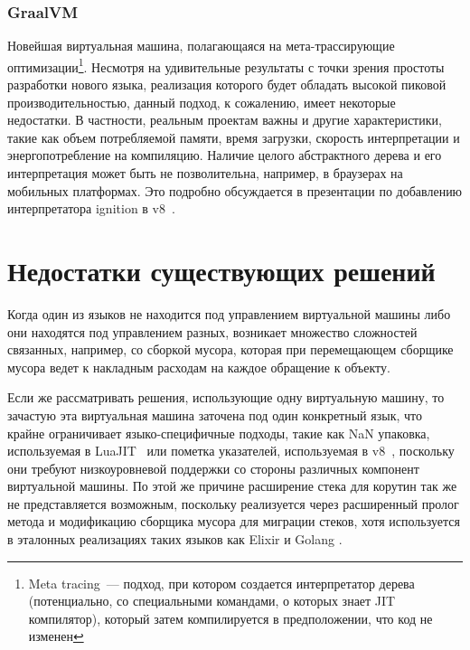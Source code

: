 \documentclass[times
]{itmo-student-thesis}
\begin{document}
\subsubsection{GraalVM}
Новейшая виртуальная машина, полагающаяся на мета-трассирующие оптимизации\footnote{Meta tracing~--- подход, при котором создается интерпретатор дерева (потенциально, со специальными командами, о которых знает JIT компилятор), который затем компилируется в предположении, что код не изменен}. Несмотря на удивительные результаты с точки зрения простоты разработки нового языка, реализация которого будет обладать высокой пиковой производительностью, данный подход, к сожалению, имеет некоторые недостатки. В частности, реальным проектам важны и другие характеристики, такие как объем потребляемой памяти, время загрузки, скорость интерпретации и энергопотребление на компиляцию. Наличие целого абстрактного дерева и его интерпретация может быть не позволительна, например, в браузерах на мобильных платформах. Это подробно обсуждается в презентации по добавлению интерпретатора ignition в v8~\cite{ignition-iterpreter}.

\section{Недостатки существующих решений}
Когда один из языков не находится под управлением виртуальной машины либо они находятся под управлением разных, возникает множество сложностей связанных, например, со сборкой мусора, которая при перемещающем сборщике мусора ведет к накладным расходам на каждое обращение к объекту.

Если же рассматривать решения, использующие одну виртуальную машину, то зачастую эта виртуальная машина заточена под один конкретный язык, что крайне ограничивает языко-специфичные подходы, такие как NaN упаковка, используемая в LuaJIT~\cite{luajit-nan-box} или пометка указателей, используемая в v8~\cite{v8-pointer-tagging}, поскольку они требуют низкоуровневой поддержки со стороны различных компонент виртуальной машины. По этой же причине расширение стека для корутин так же не представляется возможным, поскольку реализуется через расширенный пролог метода и модификацию сборщика мусора для миграции стеков, хотя используется в эталонных реализациях таких языков как Elixir и Golang \cite{golang-stack}.

\finishrelatedwork
\end{document}
